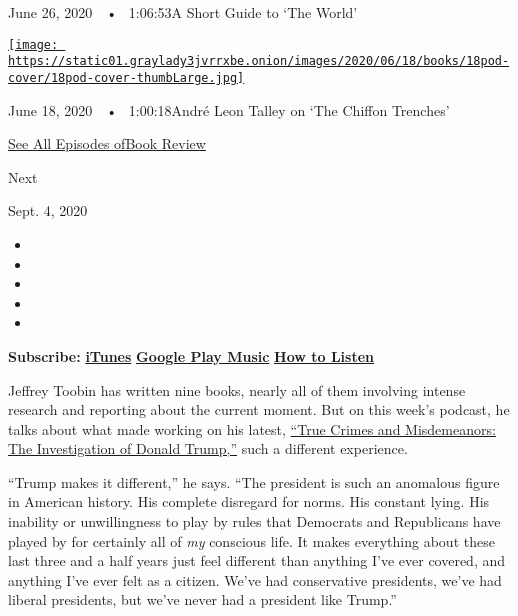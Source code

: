 June 26, 2020~~•~ 1:06:53A Short Guide to `The World'

\href{https://www.nytimes3xbfgragh.onion/2020/06/18/books/review/andre-leon-talley-chiffon-trenches-claudia-rankine-jericho-brown-megha-majumdar-burning.html?action=click\&module=audio-series-bar\&region=header\&pgtype=Article}{\texttt{[image: https://static01.graylady3jvrrxbe.onion/images/2020/06/18/books/18pod-cover/18pod-cover-thumbLarge.jpg]}}

June 18, 2020~~•~ 1:00:18André Leon Talley on `The Chiffon Trenches'

\href{https://www.nytimes3xbfgragh.onion/column/book-review-podcast}{See
All Episodes ofBook Review}

Next

Sept. 4, 2020

\begin{itemize}
\item
\item
\item
\item
\item
\end{itemize}

\textbf{Subscribe:}
\textbf{\href{https://itunes.apple.com/us/podcast/book-review/id120315179?mt=2}{iTunes}}
\textbf{\textbar{}}
\textbf{\href{https://play.google.com/music/listen?u=0\#/ps/Iv6zeb5qwjtzjfbyo3vy5zny5ky}{Google
Play Music}} \textbf{\textbar{}}
\textbf{\href{https://www.nytimes3xbfgragh.onion/2018/08/03/books/review/how-to-listen-to-the-book-review-podcast.html}{How
to Listen}}

Jeffrey Toobin has written nine books, nearly all of them involving
intense research and reporting about the current moment. But on this
week's podcast, he talks about what made working on his latest,
\href{https://www.nytimes3xbfgragh.onion/2020/08/05/books/review/true-crimes-and-misdemeanors-jeffrey-toobin.html}{``True
Crimes and Misdemeanors: The Investigation of Donald Trump,''} such a
different experience.

``Trump makes it different,'' he says. ``The president is such an
anomalous figure in American history. His complete disregard for norms.
His constant lying. His inability or unwillingness to play by rules that
Democrats and Republicans have played by for certainly all of \emph{my}
conscious life. It makes everything about these last three and a half
years just feel different than anything I've ever covered, and anything
I've ever felt as a citizen. We've had conservative presidents, we've
had liberal presidents, but we've never had a president like Trump.''

